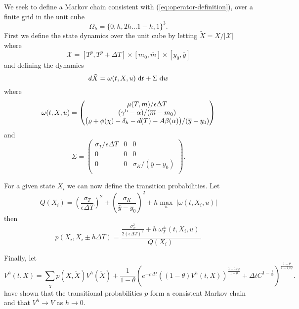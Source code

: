 \documentclass[../../main.tex]{subfiles}
\begin{document}
We seek to define a Markov chain consistent with (\ref{eq:operator-definition}), over a finite grid in the unit cube \begin{equation}\Omega_h = \{0, h, 2h \ldots 1 - h, 1\}^3.\end{equation} First we define the state dynamics over the unit cube by letting $\tilde{X} = X / \lvert\mathcal{X}\rvert$ where \begin{equation}
    \mathcal{X} = [T^p, T^p + \Delta T] \times [m_0, \overline{m}] \times [y_0, \overline{y}]
\end{equation} and defining the dynamics \begin{equation}
    d \tilde{X} = \omega(t, X, u) \; \mathrm{d}t + \Sigma \; \mathrm{d}w
\end{equation} where \begin{equation}
    \omega(t, X, u) = \begin{pmatrix}
        \mu(T, m) / \epsilon \Delta T \\
        (\gamma^{\mathrm{b}} - \alpha) / (\overline{m} - m_0) \\
        \big(\varrho + \phi(\chi) - \delta_k - d(T) - A \beta(\alpha) \big) / (\overline{y} - y_0)
    \end{pmatrix} 
\end{equation} and \begin{equation}
    \Sigma = \begin{pmatrix}
        \sigma_T / \epsilon \Delta T  & 0 & 0 \\
        0 & 0 & 0 \\
        0 & 0 & \sigma_K / (\overline{y} - y_0)\\
    \end{pmatrix}.
\end{equation}

For a given state $X_i$ we can now define the transition probabilities. Let \begin{equation}
    Q(X_i) = \left(\frac{\sigma_T}{\epsilon \Delta T}\right)^2 + \left(\frac{\sigma_K}{\overline{y} - y_0}\right)^2 + h \max_u \; \lvert \omega(t, X_i, u)  \rvert
\end{equation} then \begin{equation}
    p(X_i, X_i \pm h \Delta T) = \frac{\frac{\sigma^2_T}{2(\epsilon \Delta T)^2} + h \; \omega^{\pm}_T(t, X_i, u)}{Q(X_i)}.
\end{equation}

Finally, let \begin{equation}
    V^h(t, X) = \sum_{\tilde{X}} p(X, \tilde{X}) V^h(\tilde{X}) + \frac{1}{1 - \theta} \left(e^{-\rho \Delta t} ((1 - \theta) V^h(t, X))^{\frac{1 - 1 / \psi}{1 - \theta}} + \Delta t C^{1 - \frac{1}{\psi}} \right)^{\frac{1 - \theta}{1 - 1 / \psi}}.
\end{equation} \citep{kushner_numerical_2001} have shown that the transitional probabilities $p$ form a consistent Markov chain and that $V^h \to V$ as $h \to 0$.
\end{document}
